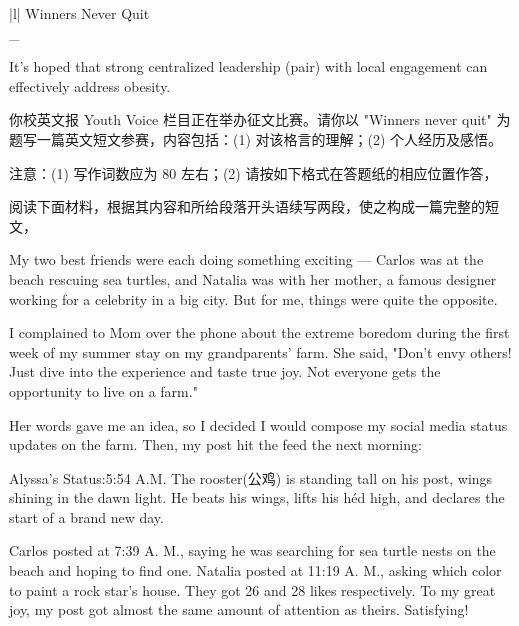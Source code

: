 \documentclass{英语试卷}
\begin{document}
\par\vspace{0.4em}
\begin{center}\begin{tabular}{{|l|}}
\hline
Winners Never Quit \\
\_ \\
\hline
\end{tabular}\end{center}
\vspace{0.4em}
\par It's hoped that strong centralized leadership  (pair) with local engagement can effectively address obesity.\par
{}
\par 你校英文报 Youth Voice 栏目正在举办征文比赛。请你以 "Winners never quit" 为题写一篇英文短文参赛，内容包括：(1) 对该格言的理解；(2) 个人经历及感悟。\par
\par 注意：(1) 写作词数应为 80 左右；(2) 请按如下格式在答题纸的相应位置作答，\par
{}
\par 阅读下面材料，根据其内容和所给段落开头语续写两段，使之构成一篇完整的短文，\par
\par My two best friends were each doing something exciting — Carlos was at the beach rescuing sea turtles, and Natalia was with her mother, a famous designer working for a celebrity in a big city. But for me, things were quite the opposite.\par
\par I complained to Mom over the phone about the extreme boredom during the first week of my summer stay on my grandparents' farm. She said, "Don't envy others! Just dive into the experience and taste true joy. Not everyone gets the opportunity to live on a farm."\par
\par Her words gave me an idea, so I decided I would compose my social media status updates on the farm. Then, my post hit the feed the next morning:\par
\par Alyssa's Status:5:54 A.M. The rooster(公鸡) is standing tall on his post, wings shining in the dawn light. He beats his wings, lifts his héd high, and declares the start of a brand new day.\par
\par Carlos posted at 7:39 A. M., saying he was searching for sea turtle nests on the beach and hoping to find one. Natalia posted at 11:19 A. M., asking which color to paint a rock star's house. They got 26 and 28 likes respectively. To my great joy, my post got almost the same amount of attention as theirs. Satisfying!\par
\end{document}
